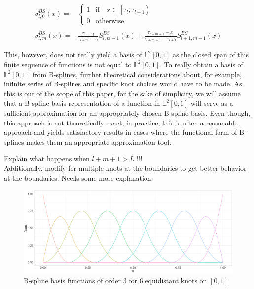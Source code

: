 \documentclass[11pt,twoside,a4paper]{article}
\begin{document}
	\begin{equation}
		\begin{split}
			S_{l,0}^{BS}(x) = &
			\begin{cases}
				1 & \text{if} \quad x \in \left[\tau_l, \tau_{l+1}\right)\\
				0 & \text{otherwise}
			\end{cases}\\ \\
			S_{l,m}^{BS}(x) = &\frac{x - \tau_l}{\tau_{l+m} - \tau_l} S_{l,m-1}^{BS}(x) + \frac{\tau_{l+m+1} - x}{\tau_{l+m+1} - \tau_{l+1}} S_{l+1,m-1}^{BS}(x)
		\end{split}
	\end{equation}
	
	This, however, does not really yield a basis of $\mathbb{L}^2[0,1]$ as the closed span of this finite sequence of functions is not equal to $\mathbb{L}^2[0,1]$. To really obtain a basis of $\mathbb{L}^2[0,1]$ from B-splines, further theoretical considerations about, for example, infinite series of B-splines and specific knot choices would have to be made. As this is out of the scope of this paper, for the sake of simplicity, we will assume that a B-spline basis representation of a function in $\mathbb{L}^2[0,1]$ will serve as a sufficient approximation for an appropriately chosen B-spline basis. 
	Even though, this approach is not theoretically exact, in practice, this is often a reasonable approach and yields satisfactory results in cases where the functional form of B-splines makes them an appropriate approximation tool. 
	
	{\color{red}Explain what happens when $l+m+1 > L$ !!!\\
		Additionally, modify for multiple knots at the boundaries to get better behavior at the boundaries. Needs some more explanation.}

	\begin{figure}[H]\label{bspline_basis}
		\includegraphics[width = \textwidth]{../Graphics/Bspline_Basis.pdf}
		\caption{B-spline basis functions of order 3 for 6 equidistant knots on $[0,1]$}
	\end{figure}
	
\end{document}
